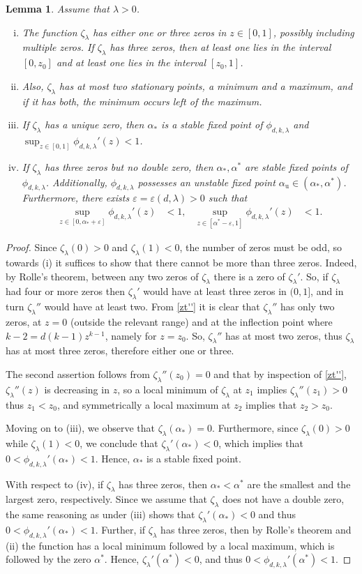 \documentclass[10pt,reqno]{amsart}
\numberwithin{equation}{section}
\newcommand\eps{\varepsilon}
\newtheorem{lemma}[definition]{Lemma}
\newcommand{\ph}{\phi_{d,k,\lambda}}
\newcommand{\zt}{\zeta_\lambda}
\begin{document}
\begin{lemma} \label{Claim13}
	Assume that $\lambda>0$.
	\begin{enumerate}[(i)]
		\item The function $\zt$ has either one or three zeros in $z \in [0,1]$, possibly including multiple zeros.
			If $\zt$ has three zeros, then at least one lies in the interval $[0,z_0]$ and at least one lies in the interval $[z_0,1]$.
		\item Also, $\zt$ has at most two stationary points, a minimum and a maximum, and if it has both, the minimum occurs left of the maximum.
		\item If $\zt$ has a unique zero, then $\alpha_*$ is a stable fixed point of $\ph$ and $\sup_{z\in[0,1]}\ph'(z)<1$.
		\item If $\zt$ has three zeros but no double zero, then $\alpha_*,\alpha^*$ are stable fixed points of $\ph$. Additionally, $\ph$ possesses an unstable fixed point $\alpha_\mathrm{u}\in(\alpha_*,\alpha^*)$.
			Furthermore, there exists $\eps=\eps(d,\lambda)>0$ such that
			\begin{align*}
				\sup_{z\in[0,\alpha_*+\eps]}\ph'(z)&<1,&\sup_{z\in[\alpha^*-\eps,1]}\ph'(z)&<1.
			\end{align*}
	\end{enumerate}
\end{lemma}
\begin{proof}
Since $\zt(0)>0$ and $\zt(1)<0$, the number of zeros must be odd, so towards (i) it suffices to show that there cannot be more than three zeros. 
Indeed, by Rolle's theorem, between any two zeros of $\zt$ there is a zero of $\zt'$.
So, if $\zt$ had four or more zeros then $\zt'$ would have at least three zeros in $(0,1]$, and in turn $\zt''$ would have at least two.
From \eqref{zt''} it is clear that $\zt''$ has only two zeros, at $z=0$ (outside the relevant range) and at the inflection point where $k-2 = d(k-1) z^{k-1}$, namely for $z=z_0$.
So, $\zt''$ has at most two zeros, thus $\zt$ has at most three zeros, therefore either one or three.

The second assertion follows from $\zt''(z_0)=0$ and that by inspection of \eqref{zt''}, $\zt''(z)$ is decreasing in $z$, so a local minimum of $\zt$ at $z_1$ implies $\zt''(z_1) > 0$ thus $z_1<z_0$, and symmetrically a local maximum at $z_2$ implies that $z_2>z_0$.

Moving on to (iii), we observe that $\zt(\alpha_*)=0$.
Furthermore, since $\zt(0)>0$ while $\zt(1)<0$, we conclude that $\zt'(\alpha_*)<0$, which implies that $0<\ph'(\alpha_*)<1$.
Hence, $\alpha_*$ is a stable fixed point.

With respect to (iv), if $\zt$ has three zeros, then $\alpha_*<\alpha^*$ are the smallest and the largest zero, respectively.
Since we assume that $\zt$ does not have a double zero, the same reasoning as under (iii) shows that $\zt'(\alpha_*)<0$ and thus $0<\ph'(\alpha_*)<1$.
Further, if $\zt$ has three zeros, then by Rolle's theorem and (ii) the function has a local minimum followed by a local maximum, which is followed by the zero $\alpha^*$.
Hence, $\zt'(\alpha^*)<0$, and thus $0<\ph'(\alpha^*)<1$.
\end{proof}
\end{document}
